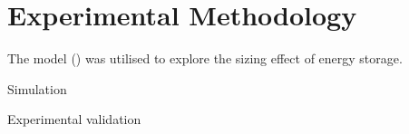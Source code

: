 \section{Experimental Methodology} \label{sec:c3_method}

The model () was utilised to explore the sizing effect of energy storage. 

Simulation

Experimental validation